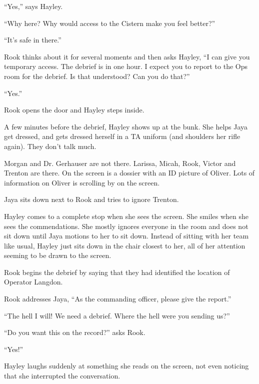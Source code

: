 ``Yes,'' says Hayley.

``Why here?  Why would access to the Cistern make you feel better?''

``It's safe in there.''

Rook thinks about it for several moments and then asks Hayley, ``I can give you temporary access.  The debrief is in one hour.  I expect you to report to the Ops room for the debrief.  Is that understood?  Can you do that?''

``Yes.''

Rook opens the door and Hayley steps inside.





A few minutes before the debrief, Hayley shows up at the bunk.  She helps Jaya get dressed, and gets dressed herself in a TA uniform (and shoulders her rifle again).  They don't talk much.





Morgan and Dr. Gerhauser are not there.  Larissa, Micah, Rook, Victor and Trenton are there.  On the screen is a dossier with an ID picture of Oliver.  Lots of information on Oliver is scrolling by on the screen.



Jaya sits down next to Rook and tries to ignore Trenton.



Hayley comes to a complete stop when she sees the screen.  She smiles when she sees the commendations.  She mostly ignores everyone in the room and does not sit down until Jaya motions to her to sit down.  Instead of sitting with her team like usual, Hayley just sits down in the chair closest to her, all of her attention seeming to be drawn to the screen.



Rook begins the debrief by saying that they had identified the location of Operator Langdon.  

Rook addresses Jaya, ``As the commanding officer, please give the report.'' 

``The hell I will!  We need a debrief.  Where the hell were you sending us?''

``Do you want this on the record?'' asks Rook.

``Yes!''

Hayley laughs suddenly at something she reads on the screen, not even noticing that she interrupted the conversation.

